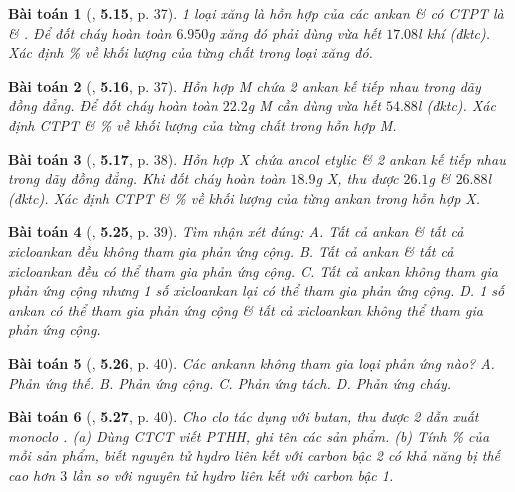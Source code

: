 \documentclass{article}
\numberwithin{equation}{section}
\newtheorem{baitoan}{Bài toán}[section]
\begin{document}
\begin{baitoan}[\cite{SBT_Hoa_Hoc_11_co_ban}, \textbf{5.15}, p. 37]
	1 loại xăng là hỗn hợp của các ankan \& có CTPT là \emph{} \& \emph{}. Để đốt cháy hoàn toàn $6.950$\emph{g} xăng đó phải dùng vừa hết $17.08$\emph{l} khí \emph{} (đktc). Xác định \% về khối lượng của từng chất trong loại xăng đó. 
\end{baitoan}

\begin{baitoan}[\cite{SBT_Hoa_Hoc_11_co_ban}, \textbf{5.16}, p. 37]
	Hỗn hợp M chứa 2 ankan kế tiếp nhau trong dãy đồng đẳng. Để đốt cháy hoàn toàn $22.2$\emph{g} M cần dùng vừa hết $54.88$\emph{l} \emph{} (đktc). Xác định CTPT \& \% về khối lượng của từng chất trong hỗn hợp M.
\end{baitoan}

\begin{baitoan}[\cite{SBT_Hoa_Hoc_11_co_ban}, \textbf{5.17}, p. 38]
	Hỗn hợp X chứa ancol etylic \emph{} \& 2 ankan kế tiếp nhau trong dãy đồng đẳng. Khi đốt cháy hoàn toàn $18.9$\emph{g} X, thu được $26.1$\emph{g } \& $26.88$\emph{l } (đktc). Xác định CTPT \& \% về khối lượng của từng ankan trong hỗn hợp X.
\end{baitoan}

\begin{baitoan}[\cite{SBT_Hoa_Hoc_11_co_ban}, \textbf{5.25}, p. 39]
	Tìm nhận xét đúng: {\sf A.} Tất cả ankan \& tất cả xicloankan đều không tham gia phản ứng cộng. {\sf B.} Tất cả ankan \& tất cả xicloankan đều có thể tham gia phản ứng cộng. {\sf C.} Tất cả ankan không tham gia phản ứng cộng nhưng 1 số xicloankan lại có thể tham gia phản ứng cộng. {\sf D.} 1 số ankan có thể tham gia phản ứng cộng \& tất cả xicloankan không thể tham gia phản ứng cộng.
\end{baitoan}

\begin{baitoan}[\cite{SBT_Hoa_Hoc_11_co_ban}, \textbf{5.26}, p. 40]
	Các ankann không tham gia loại phản ứng nào? {\sf A.} Phản ứng thế. {\sf B.} Phản ứng cộng. {\sf C.} Phản ứng tách. {\sf D.} Phản ứng cháy.
\end{baitoan}

\begin{baitoan}[\cite{SBT_Hoa_Hoc_11_co_ban}, \textbf{5.27}, p. 40]
	Cho clo tác dụng với butan, thu được 2 dẫn xuất monoclo \emph{}. (a) Dùng CTCT viết PTHH, ghi tên các sản phẩm. (b) Tính \% của mỗi sản phẩm, biết nguyên tử hydro liên kết với carbon bậc 2 có khả năng bị thế cao hơn $3$ lần so với nguyên tử hydro liên kết với carbon bậc 1.
\end{baitoan}
\end{document}
